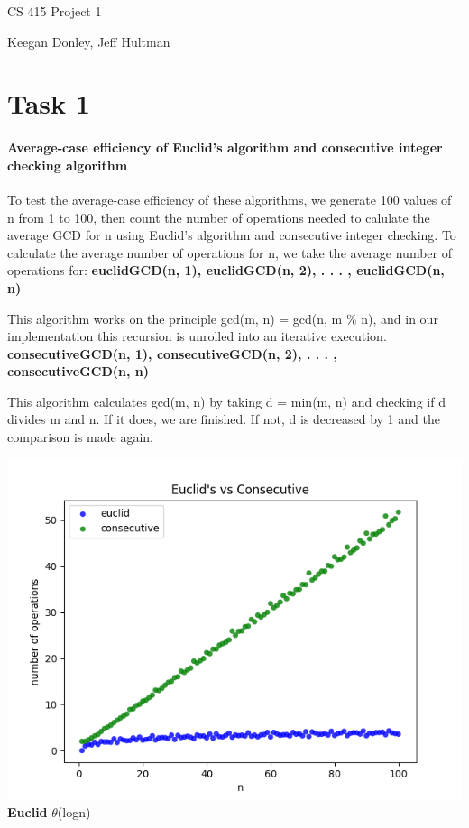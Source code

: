 \documentclass{report}
\begin{document}
	\begin{flushleft}
		\huge CS 415 Project 1
		
		\normalsize Keegan Donley, Jeff Hultman
		\section{Task 1}
		\paragraph{Average-case efficiency of Euclid's algorithm and consecutive integer checking algorithm}
		To test the average-case efficiency of these algorithms, we generate
		100 values of n from 1 to 100, then count the number of
		operations needed to calulate the average GCD for n using
		Euclid's algorithm and consecutive integer checking.
		To calculate the average number of operations for n, we take the average
		number of operations for:
		\linebreak
		\linebreak
		\textbf{euclidGCD(n, 1), euclidGCD(n, 2), . . . , euclidGCD(n, n)} 
		
		This algorithm works on the principle gcd(m, n) = gcd(n, m \% n), and in our implementation this recursion is unrolled into an iterative execution.
		\linebreak
		\linebreak
		\textbf{consecutiveGCD(n, 1), consecutiveGCD(n, 2), . . . , consecutiveGCD(n, n)}

		This algorithm calculates gcd(m, n) by taking d = min(m, n) and checking if d divides m and n. If it does, we are finished. If not, d is decreased by 1 and the 
		comparison is made again.

		\includegraphics[scale=0.9]{task1.png}
		\linebreak
		\linebreak
		\linebreak
		\textbf{Euclid} $\theta$(logn)


\end{flushleft}
\end{document}
